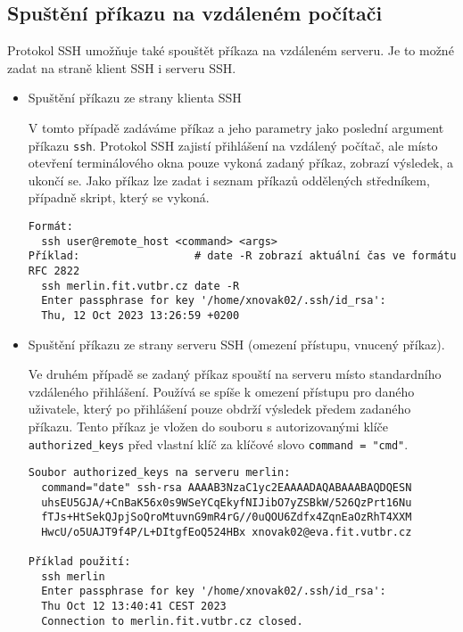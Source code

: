 \subsection{Spuštění příkazu na vzdáleném počítači}
Protokol SSH umožňuje také spouštět příkaza na vzdáleném serveru. Je to možné zadat na straně klient SSH i serveru SSH.
\begin{itemize}
  \item Spuštění příkazu ze strany klienta SSH

    V tomto případě zadáváme příkaz a jeho parametry jako poslední argument příkazu {\tt ssh}. Protokol SSH zajistí přihlášení na vzdálený počítač, ale místo otevření terminálového okna pouze vykoná zadaný příkaz, zobrazí výsledek, a ukončí se. Jako příkaz lze zadat i seznam příkazů oddělených středníkem, případně skript, který se vykoná. 
\begin{verbatim}
Formát:
  ssh user@remote_host <command> <args>
Příklad:                  # date -R zobrazí aktuální čas ve formátu RFC 2822
  ssh merlin.fit.vutbr.cz date -R     
  Enter passphrase for key '/home/xnovak02/.ssh/id_rsa':
  Thu, 12 Oct 2023 13:26:59 +0200
\end{verbatim}        
  \item Spuštění příkazu ze strany serveru SSH (omezení přístupu, vnucený příkaz).

    Ve druhém případě se zadaný příkaz spouští na serveru místo standardního vzdáleného přihlášení. Používá se spíše k omezení přístupu pro daného uživatele, který po přihlášení pouze obdrží výsledek předem zadaného příkazu. Tento příkaz je vložen do souboru s autorizovanými klíče {\tt authorized\_keys} před vlastní klíč za klíčové slovo \verb|command = "cmd"|.
\begin{verbatim}
Soubor authorized_keys na serveru merlin:
  command="date" ssh-rsa AAAAB3NzaC1yc2EAAAADAQABAAABAQDQESN
  uhsEU5GJA/+CnBaK56x0s9WSeYCqEkyfNIJibO7yZSBkW/526QzPrt16Nu
  fTJs+HtSekQJpjSoQroMtuvnG9mR4rG//0uQOU6Zdfx4ZqnEaOzRhT4XXM
  HwcU/o5UAJT9f4P/L+DItgfEoQ524HBx xnovak02@eva.fit.vutbr.cz

Příklad použití: 
  ssh merlin
  Enter passphrase for key '/home/xnovak02/.ssh/id_rsa': 
  Thu Oct 12 13:40:41 CEST 2023
  Connection to merlin.fit.vutbr.cz closed.
\end{verbatim}        
\end{itemize}

